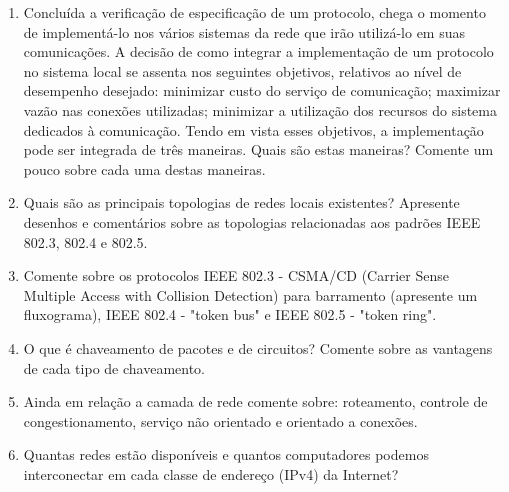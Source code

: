 \documentclass[10pt]{article}
\begin{document}
\begin{enumerate}
    \item Concluída a verificação de especificação de um protocolo, chega o momento
    de implementá-lo nos vários sistemas da rede que irão utilizá-lo em suas 
    comunicações. A decisão de como integrar a implementação de um protocolo no 
    sistema local se assenta nos seguintes objetivos, relativos ao nível de desempenho
    desejado: minimizar custo do serviço de comunicação; maximizar vazão nas conexões
    utilizadas; minimizar a utilização dos recursos do sistema dedicados à comunicação.
    Tendo em vista esses objetivos, a implementação pode ser integrada de três 
    maneiras. Quais são estas maneiras? Comente um pouco sobre cada uma destas
    maneiras.

    \item Quais são as principais topologias de redes locais existentes? Apresente
    desenhos e comentários sobre as topologias relacionadas aos padrões IEEE 802.3,
    802.4 e 802.5.

    \item Comente sobre os protocolos IEEE 802.3 - CSMA/CD (Carrier Sense Multiple
    Access with Collision Detection) para barramento (apresente um fluxograma),
    IEEE 802.4 - "token bus" e IEEE 802.5 - "token ring".

    \item O que é chaveamento de pacotes e de circuitos? Comente sobre as vantagens
    de cada tipo de chaveamento.

    \item Ainda em relação a camada de rede comente sobre: roteamento, controle de 
    congestionamento, serviço não orientado e orientado a conexões. 

    \item Quantas redes estão disponíveis e quantos computadores podemos interconectar
    em cada classe de endereço (IPv4) da Internet?
\end{enumerate}
\end{document}
